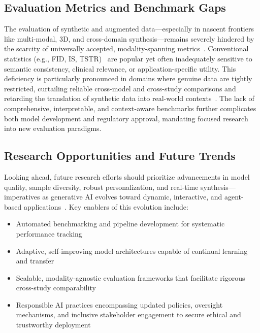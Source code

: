 \subsection{Evaluation Metrics and Benchmark Gaps}

The evaluation of synthetic and augmented data—especially in nascent frontiers like multi-modal, 3D, and cross-domain synthesis—remains severely hindered by the scarcity of universally accepted, modality-spanning metrics~\cite{ref35,ref52,ref53,ref81,ref89,ref91}. Conventional statistics (e.g., FID, IS, TSTR)~\cite{ref35,ref52,ref53} are popular yet often inadequately sensitive to semantic consistency, clinical relevance, or application-specific utility. This deficiency is particularly pronounced in domains where genuine data are tightly restricted, curtailing reliable cross-model and cross-study comparisons and retarding the translation of synthetic data into real-world contexts~\cite{ref81,ref89,ref91}. The lack of comprehensive, interpretable, and context-aware benchmarks further complicates both model development and regulatory approval, mandating focused research into new evaluation paradigms.

\subsection{Research Opportunities and Future Trends}

Looking ahead, future research efforts should prioritize advancements in model quality, sample diversity, robust personalization, and real-time synthesis—imperatives as generative AI evolves toward dynamic, interactive, and agent-based applications~\cite{ref88,ref89,ref90,ref101,ref102}. Key enablers of this evolution include:

\begin{itemize}
    \item Automated benchmarking and pipeline development for systematic performance tracking~\cite{ref88,ref89}
    \item Adaptive, self-improving model architectures capable of continual learning and transfer
    \item Scalable, modality-agnostic evaluation frameworks that facilitate rigorous cross-study comparability
    \item Responsible AI practices encompassing updated policies, oversight mechanisms, and inclusive stakeholder engagement to secure ethical and trustworthy deployment~\cite{ref1,ref8,ref11,ref15,ref16,ref24,ref32,ref54,ref58,ref60,ref63,ref67,ref68,ref69,ref70,ref76,ref77,ref78,ref81,ref82,ref88,ref89}
\end{itemize}

